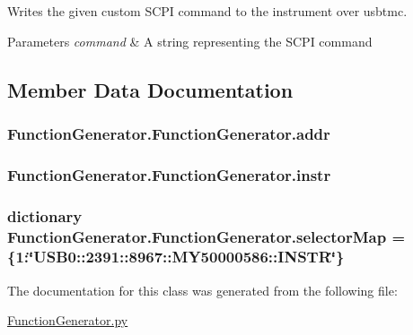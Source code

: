 Writes the given custom S\+C\+P\+I command to the instrument over usbtmc. 


\begin{DoxyParams}{Parameters}
{\em command} & A string representing the S\+C\+P\+I command \\
\hline
\end{DoxyParams}


\subsection{Member Data Documentation}
\hypertarget{class_function_generator_1_1_function_generator_a6232661c93750461489cadd41b721d56}{}
\subsubsection[{addr}]{\setlength{\rightskip}{0pt plus 5cm}Function\+Generator.\+Function\+Generator.\+addr}\label{class_function_generator_1_1_function_generator_a6232661c93750461489cadd41b721d56}
\hypertarget{class_function_generator_1_1_function_generator_a31f74674e20ebd808c28abf817cafccf}{}
\subsubsection[{instr}]{\setlength{\rightskip}{0pt plus 5cm}Function\+Generator.\+Function\+Generator.\+instr}\label{class_function_generator_1_1_function_generator_a31f74674e20ebd808c28abf817cafccf}
\hypertarget{class_function_generator_1_1_function_generator_af0f7aaea68bd468c28524373f6005d8f}{}
\subsubsection[{selector\+Map}]{\setlength{\rightskip}{0pt plus 5cm}dictionary Function\+Generator.\+Function\+Generator.\+selector\+Map = \{1\+:\char`\"{}U\+S\+B0\+::2391\+::8967\+::\+M\+Y50000586\+::\+I\+N\+S\+T\+R\char`\"{}\}\hspace{0.3cm}{\ttfamily [static]}}\label{class_function_generator_1_1_function_generator_af0f7aaea68bd468c28524373f6005d8f}


The documentation for this class was generated from the following file\+:\begin{DoxyCompactItemize}
\item 
\hyperlink{_function_generator_8py}{Function\+Generator.\+py}\end{DoxyCompactItemize}

